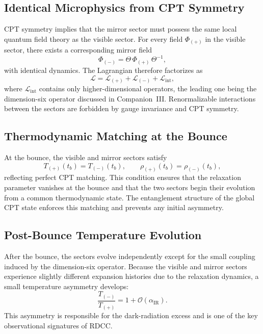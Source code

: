 \documentclass[11pt,a4paper]{article}
\begin{document}
\subsection{Identical Microphysics from CPT Symmetry}

CPT symmetry implies that the mirror sector must possess the same local quantum field theory as the visible sector. For every field $\Phi_{(+)}$ in the visible sector, there exists a corresponding mirror field
\begin{equation}
    \Phi_{(-)} = \Theta\,\Phi_{(+)}\,\Theta^{-1},
\end{equation}
with identical dynamics. The Lagrangian therefore factorizes as
\begin{equation}
    \mathcal{L} = \mathcal{L}_{(+)} + \mathcal{L}_{(-)} + \mathcal{L}_{\mathrm{int}},
\end{equation}
where $\mathcal{L}_{\mathrm{int}}$ contains only higher-dimensional operators, the leading one being the dimension-six operator discussed in Companion~III. Renormalizable interactions between the sectors are forbidden by gauge invariance and CPT symmetry.

\subsection{Thermodynamic Matching at the Bounce}

At the bounce, the visible and mirror sectors satisfy
\begin{equation}
    T_{(+)}(t_b) = T_{(-)}(t_b), \qquad
    \rho_{(+)}(t_b) = \rho_{(-)}(t_b),
\end{equation}
reflecting perfect CPT matching. This condition ensures that the relaxation parameter vanishes at the bounce and that the two sectors begin their evolution from a common thermodynamic state. The entanglement structure of the global CPT state enforces this matching and prevents any initial asymmetry.

\subsection{Post-Bounce Temperature Evolution}

After the bounce, the sectors evolve independently except for the small coupling induced by the dimension-six operator. Because the visible and mirror sectors experience slightly different expansion histories due to the relaxation dynamics, a small temperature asymmetry develops:
\begin{equation}
    \frac{T_{(-)}}{T_{(+)}} = 1 + \mathcal{O}(\alpha_{\mathrm{IR}}).
\end{equation}
This asymmetry is responsible for the dark-radiation excess and is one of the key observational signatures of RDCC.
\end{document}
